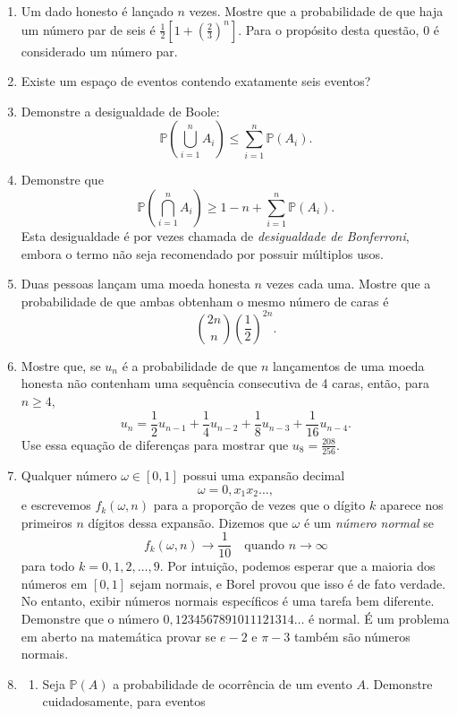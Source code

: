 \documentclass[12pt,portuguese]{article}
\let\leq\leqslant
\let\geq\geqslant
\theoremstyle{definition}
\begin{document}
\begin{enumerate}[label={\arabic*.}]
\item Um dado honesto é lançado \(n\) vezes. Mostre que a probabilidade de
que haja um número par de seis é \(\tfrac{1}{2}[1 +
(\tfrac{2}{3})^n]\). Para o propósito desta questão, 0 é considerado um
número par.
\item Existe um espaço de eventos contendo exatamente seis eventos?
\item Demonstre a desigualdade de Boole:
\[
\mathbb{P}\left(\bigcup_{i=1}^n A_i\right) \leq \sum_{i=1}^n
\mathbb{P}(A_i).
\]
\item Demonstre que
\[
\mathbb{P}\left(\bigcap_{i=1}^n A_i\right) \geq 1 - n +
\sum_{i=1}^n \mathbb{P}(A_i).
\]
Esta desigualdade é por vezes chamada de \emph{desigualdade de
Bonferroni}, embora o termo não seja recomendado por possuir múltiplos
usos.
\item Duas pessoas lançam uma moeda honesta \(n\) vezes cada uma. Mostre que
a probabilidade de que ambas obtenham o mesmo número de caras é
\[
\binom{2n}{n} \left(\frac{1}{2}\right)^{2n}.
\]
\item Mostre que, se \(u_n\) é a probabilidade de que \(n\) lançamentos de
uma moeda honesta não contenham uma sequência consecutiva de 4 caras,
então, para \(n \geq 4\),
\[
u_n = \frac{1}{2}u_{n-1} + \frac{1}{4}u_{n-2} + \frac{1}{8}u_{n-3}
+ \frac{1}{16}u_{n-4}.
\]
Use essa equação de diferenças para mostrar que \(u_8 =
\frac{208}{256}\).
\item[\starredproblem] Qualquer número \(\omega \in [0, 1]\) possui uma
expansão decimal
\[
\omega = 0{,}x_1 x_2 \dots,
\]
e escrevemos \(f_k(\omega, n)\) para a proporção de vezes que o dígito
\(k\) aparece nos primeiros \(n\) dígitos dessa expansão. Dizemos que
\(\omega\) é um \emph{número normal} se
\[
f_k(\omega, n) \to \frac{1}{10} \quad \text{quando } n \to \infty
\]
para todo \(k = 0, 1, 2, \dots, 9\). Por intuição, podemos esperar
que a maioria dos números em \([0, 1]\) sejam normais, e Borel provou
que isso é de fato verdade. No entanto, exibir números normais
específicos é uma tarefa bem diferente. Demonstre que o número
\(0{,}1234567891011121314\ldots\) é normal. É um problema em aberto
na matemática provar se \(e - 2\) e \(\pi - 3\) também são números
normais.
\item \begin{enumerate}[label=(\alph*), ref=\alph*]
\item Seja \(\mathbb{P}(A)\) a probabilidade de ocorrência de um
evento \(A\). Demonstre cuidadosamente, para eventos

\end{enumerate}
\end{enumerate}
\end{document}
